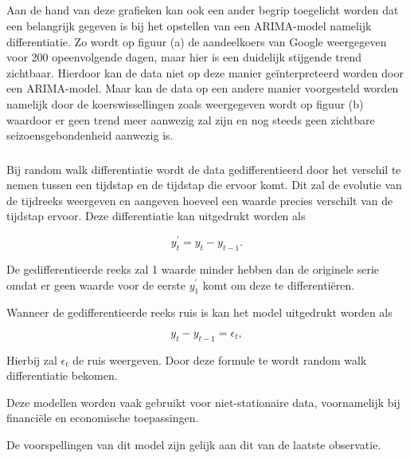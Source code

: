 \subsection{}

Aan de hand van deze grafieken kan ook een ander begrip toegelicht worden dat een belangrijk gegeven is bij het opstellen van een ARIMA-model namelijk differentiatie. Zo wordt op figuur (a) de aandeelkoers van Google weergegeven voor 200 opeenvolgende dagen, maar hier is een duidelijk stijgende trend zichtbaar. Hierdoor kan de data niet op deze manier ge\"{i}nterpreteerd worden door een ARIMA-model. Maar kan de data op een andere manier voorgesteld worden namelijk door de koerswissellingen zoals weergegeven wordt op figuur (b) waardoor er geen trend meer aanwezig zal zijn en nog steeds geen zichtbare seizoensgebondenheid aanwezig is. 

\subsubsection{}
Bij random walk differentiatie wordt de data gedifferentieerd door het verschil te nemen tussen een tijdstap en de tijdstap die ervoor komt. Dit zal de evolutie van de tijdreeks weergeven en aangeven hoeveel een waarde precies verschilt van de tijdstap ervoor. Deze differentiatie kan uitgedrukt worden als

\begin{equation}
y_t^\prime = y_t - y_{t-1}.
\end{equation}

De gedifferentieerde reeks zal 1 waarde minder hebben dan de originele serie omdat er geen waarde voor de eerste $y_1^\prime$ komt om deze te differenti\"{e}ren.
 
Wanneer de gedifferentieerde reeks ruis is kan het model uitgedrukt worden als 
 
\begin{equation}
y_t - y_{t-1} = \epsilon_t,
\end{equation}

Hierbij zal $\epsilon_t$ de ruis weergeven. Door deze formule te wordt random walk differentiatie bekomen.

Deze modellen worden vaak gebruikt voor niet-stationaire data, voornamelijk bij financi\"{e}le en economische toepassingen.

De voorspellingen van dit model zijn gelijk aan dit van de laatste observatie.

